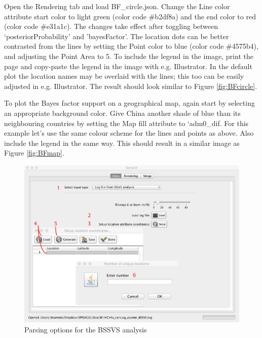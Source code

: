 \documentclass[english]{paper}
\begin{document}
Open the Rendering tab and load BF\_circle.json.
Change the Line color attribute start color to light green (color code \#b2df8a) and the end color to red (color code \#e31a1c).
The changes take effect after toggling between `posteriorProbability' and 'bayesFactor'.
The location dots can be better contrasted from the lines by setting the Point color to blue (color code \#4575b4), and adjusting the Point Area to 5. 
To include the legend in the image, print the page and copy-paste the legend in the image with e.g. Illustrator. 
In the default plot the location names may be overlaid with the lines; this too can be easily adjusted in e.g. Illustrator.
The result should look similar to Figure \ref{fig:BFcircle}.
\par
To plot the Bayes factor support on a geographical map, again start by selecting an appropriate background color.
Give China another shade of blue than its neighbouring countries by setting the Map fill attribute to `adm0\_dif.
For this example let's use the same colour scheme for the lines and points as above. 
Also include the legend in the same way. 
This should result in a similar image as Figure \ref{fig:BFmap}.

\begin{figure}%
\centering
\includegraphics[width=1\textwidth]{./figures/Fig5_BFparse.pdf} %
\caption{Parsing options for the BSSVS analysis}
\label{fig:parseBF}
\end{figure}
\end{document}
